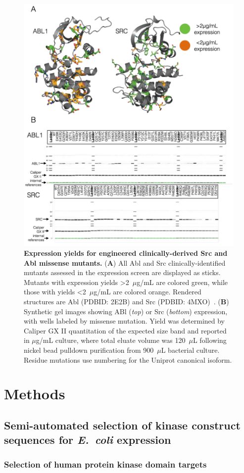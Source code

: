 \documentclass[phd,tocprelim]{cornell}
\begin{document}
\begin{landscape}
	\begin{figure}[p]
		\centering
		\includegraphics[width=0.5\linewidth]{figures/96-mutants-finalfigure.pdf}
		\caption[Expression yields for engineered clinically-derived Src and Abl missense mutants]{{\bf Expression yields for engineered clinically-derived Src and Abl missense mutants.}
			({\bf A}) All Abl and Src clinically-identified mutants assessed in the expression screen are displayed as sticks. 
			Mutants with expression yields >2~$\mu$g/mL are colored green, while those with yields <2~$\mu$g/mL are colored orange. 
			Rendered structures are Abl (PDBID: 2E2B) and Src (PDBID: 4MXO)~\citep{Levinson:2014gi}.
			({\bf B}) Synthetic gel images showing ABl (\emph{top}) or Src (\emph{bottom}) expression, with wells labeled by missense mutation.  
			Yield  was determined by Caliper GX II quantitation of the expected size band and reported in $\mu$g/mL culture, where total eluate volume was 120~$\mu$L following nickel bead pulldown purification from 900~$\mu$L bacterial culture.
			Residue mutations use numbering for the Uniprot canonical isoform.}
		\label{fig:96-mutant-fig}
	\end{figure}
\end{landscape}

\section{Methods}

\subsection{Semi-automated selection of kinase construct sequences for \emph{E.~coli} expression}

\subsubsection{Selection of human protein kinase domain targets}
\end{document}
